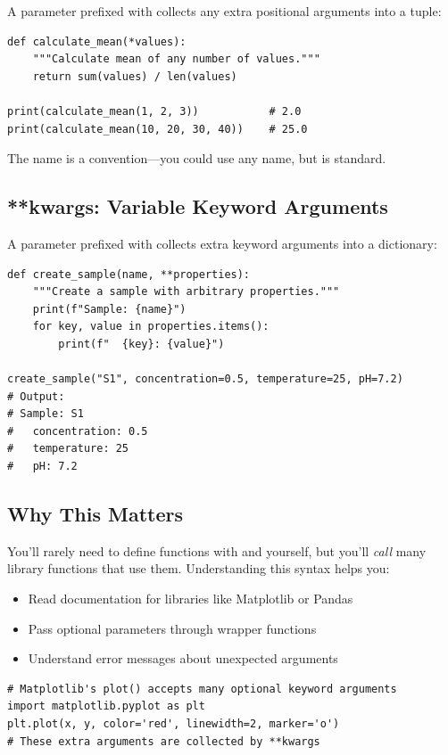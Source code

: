 A parameter prefixed with \py{*} collects any extra positional arguments into a tuple:

\begin{lstlisting}
def calculate_mean(*values):
    """Calculate mean of any number of values."""
    return sum(values) / len(values)

print(calculate_mean(1, 2, 3))           # 2.0
print(calculate_mean(10, 20, 30, 40))    # 25.0
\end{lstlisting}

The name  is a convention---you could use any name, but  is standard.

\subsection{**kwargs: Variable Keyword Arguments}

A parameter prefixed with \py{**} collects extra keyword arguments into a dictionary:

\begin{lstlisting}
def create_sample(name, **properties):
    """Create a sample with arbitrary properties."""
    print(f"Sample: {name}")
    for key, value in properties.items():
        print(f"  {key}: {value}")

create_sample("S1", concentration=0.5, temperature=25, pH=7.2)
# Output:
# Sample: S1
#   concentration: 0.5
#   temperature: 25
#   pH: 7.2
\end{lstlisting}

\subsection{Why This Matters}

You'll rarely need to define functions with  and  yourself, but you'll \emph{call} many library functions that use them. Understanding this syntax helps you:

\begin{itemize}
    \item Read documentation for libraries like Matplotlib or Pandas
    \item Pass optional parameters through wrapper functions
    \item Understand error messages about unexpected arguments
\end{itemize}

\begin{lstlisting}
# Matplotlib's plot() accepts many optional keyword arguments
import matplotlib.pyplot as plt
plt.plot(x, y, color='red', linewidth=2, marker='o')
# These extra arguments are collected by **kwargs
\end{lstlisting}

